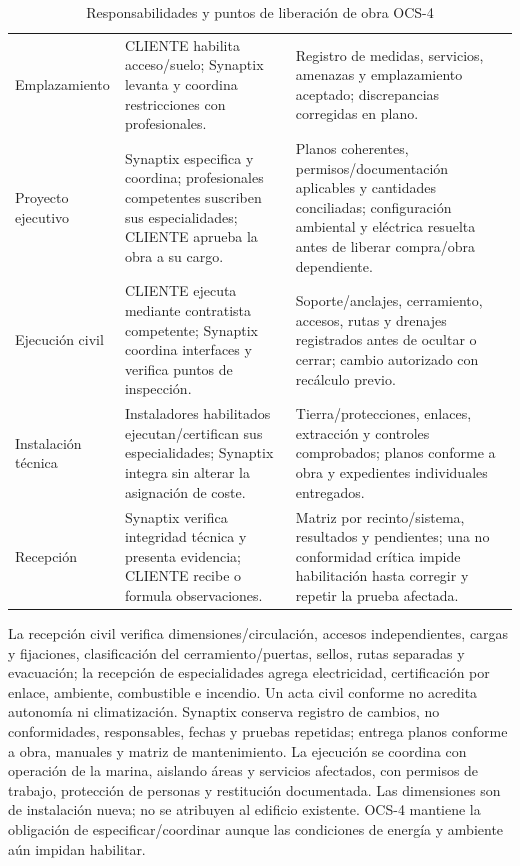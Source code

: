 \begin{table}[htbp]
\centering\small
\caption{Responsabilidades y puntos de liberación de obra OCS-4}\label{tab:sd4-ocs4}
\begin{tabularx}{\linewidth}{L{24mm}X X}
\hline
{} &  &  \\ \hline
Emplazamiento & CLIENTE habilita acceso/suelo; Synaptix levanta y coordina restricciones con profesionales. & Registro de medidas, servicios, amenazas y emplazamiento aceptado; discrepancias corregidas en plano. \\ \hline
Proyecto ejecutivo & Synaptix especifica y coordina; profesionales competentes suscriben sus especialidades; CLIENTE aprueba la obra a su cargo. & Planos coherentes, permisos/documentación aplicables y cantidades conciliadas; configuración ambiental y eléctrica resuelta antes de liberar compra/obra dependiente. \\ \hline
Ejecución civil & CLIENTE ejecuta mediante contratista competente; Synaptix coordina interfaces y verifica puntos de inspección. & Soporte/anclajes, cerramiento, accesos, rutas y drenajes registrados antes de ocultar o cerrar; cambio autorizado con recálculo previo. \\ \hline
Instalación técnica & Instaladores habilitados ejecutan/certifican sus especialidades; Synaptix integra sin alterar la asignación de coste. & Tierra/protecciones, enlaces, extracción y controles comprobados; planos conforme a obra y expedientes individuales entregados. \\ \hline
Recepción & Synaptix verifica integridad técnica y presenta evidencia; CLIENTE recibe o formula observaciones. & Matriz por recinto/sistema, resultados y pendientes; una no conformidad crítica impide habilitación hasta corregir y repetir la prueba afectada. \\ \hline
\end{tabularx}
\end{table}

La recepción civil verifica dimensiones/circulación, accesos independientes, cargas y fijaciones, clasificación del cerramiento/puertas, sellos, rutas separadas y evacuación; la recepción de especialidades agrega electricidad, certificación por enlace, ambiente, combustible e incendio. Un acta civil conforme no acredita autonomía ni climatización. Synaptix conserva registro de cambios, no conformidades, responsables, fechas y pruebas repetidas; entrega planos conforme a obra, manuales y matriz de mantenimiento. La ejecución se coordina con operación de la marina, aislando áreas y servicios afectados, con permisos de trabajo, protección de personas y restitución documentada. Las dimensiones son de instalación nueva; no se atribuyen al edificio existente. OCS-4 mantiene la obligación de especificar/coordinar aunque las condiciones de energía y ambiente aún impidan habilitar.

